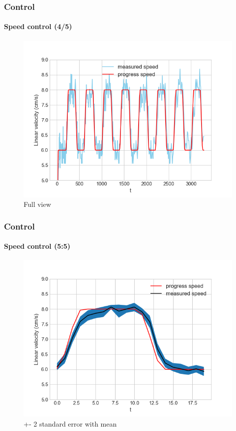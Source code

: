 \documentclass[10pt]{beamer}
\begin{document}

\begin{frame}
\frametitle{Control}
\framesubtitle{Speed control (4/5)}
\begin{figure}[hbtp]
\centering
\includegraphics[scale=0.45]{figures/pid_speed_normal.png}
\caption{Full view}
\end{figure}
\end{frame}


\begin{frame}
\frametitle{Control}
\framesubtitle{Speed control (5:5)}
\begin{figure}[hbtp]
\centering
\includegraphics[scale=0.45]{figures/pid_speed_shaded.png}
\caption{+- 2 standard error with mean}
\end{figure}
\end{frame}
\end{document}

